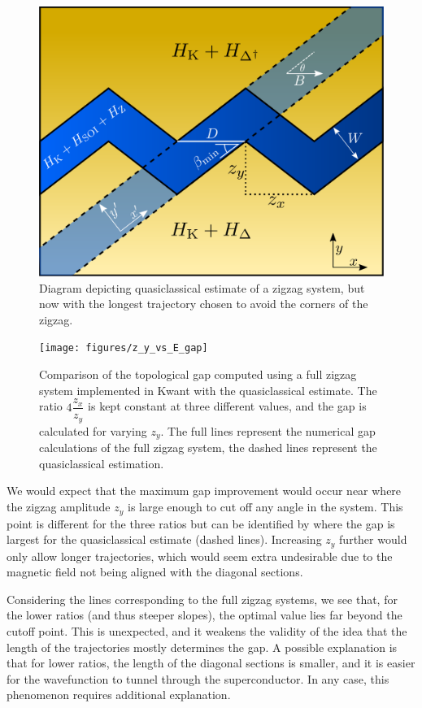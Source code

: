 			\begin{figure}
			\centering
			\includegraphics[width=0.75\columnwidth]{images/longest_trajectory_wo_corners}
			\caption{Diagram depicting quasiclassical estimate of a zigzag system, but now with the longest trajectory chosen to avoid the corners of the zigzag.}
			\label{fig:quasiclassical_approximation}
			\end{figure}

			\begin{figure}[!htb]
			\centering
			\texttt{[image: figures/z\_y\_vs\_E\_gap]}
			\caption{Comparison of the topological gap computed using a full zigzag system implemented in Kwant with the quasiclassical estimate.
			The ratio $4\dfrac{z_x}{z_y}$ is kept constant at three different values, and the gap is calculated for varying $z_y$.
			The full lines represent  the numerical gap calculations of the full zigzag system, the dashed lines represent the quasiclassical estimation.}
			\label{fig:quasiclassical_approximation}
			\end{figure}

			We would expect that the maximum gap improvement would occur near where the zigzag amplitude $z_y$ is large enough to cut off any angle in the system.
			This point is different for the three ratios but can be identified by where the gap is largest for the quasiclassical estimate (dashed lines).
			Increasing $z_y$ further would only allow longer trajectories, which would seem extra undesirable due to the magnetic field not being aligned with the diagonal sections.

			Considering the lines corresponding to the full zigzag systems, we see that, for the lower ratios (and thus steeper slopes), the optimal value lies far beyond the cutoff point.
			This is unexpected, and it weakens the validity of the idea that the length of the trajectories mostly determines the gap.
			A possible explanation is that for lower ratios, the length of the diagonal sections is smaller, and it is easier for the wavefunction to tunnel through the superconductor.
			In any case, this phenomenon requires additional explanation.

